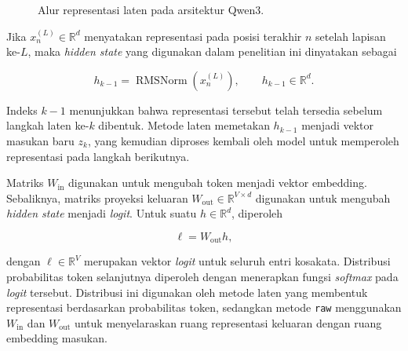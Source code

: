 \begin{figure}[H]
    \caption{Alur representasi laten pada arsitektur Qwen3.}
    \label{fig:alur-qwen3}
\end{figure}



Jika $x_n^{(L)}\in\mathbb{R}^{d}$ menyatakan representasi pada posisi terakhir $n$ setelah lapisan ke-$L$, maka \textit{hidden state} yang digunakan dalam penelitian ini dinyatakan sebagai

\begin{equation}
h_{k-1}
=
\operatorname{RMSNorm}\left(x_n^{(L)}\right),
\qquad
h_{k-1}\in\mathbb{R}^{d}.
\label{eq:m-arch-h}
\end{equation}

Indeks $k-1$ menunjukkan bahwa representasi tersebut telah tersedia sebelum langkah laten ke-$k$ dibentuk. Metode laten memetakan $h_{k-1}$ menjadi vektor masukan baru $z_k$, yang kemudian diproses kembali oleh model untuk memperoleh representasi pada langkah berikutnya.

Matriks $W_{\mathrm{in}}$ digunakan untuk mengubah token menjadi vektor embedding. Sebaliknya, matriks proyeksi keluaran $W_{\mathrm{out}}\in\mathbb{R}^{V\times d}$ digunakan untuk mengubah \textit{hidden state} menjadi \textit{logit}. Untuk suatu $h\in\mathbb{R}^{d}$, diperoleh

\begin{equation}
\ell
=
W_{\mathrm{out}}h,
\label{eq:m-arch-logit}
\end{equation}

dengan $\ell\in\mathbb{R}^{V}$ merupakan vektor \textit{logit} untuk seluruh entri kosakata. Distribusi probabilitas token selanjutnya diperoleh dengan menerapkan fungsi \textit{softmax} pada \textit{logit} tersebut. Distribusi ini digunakan oleh metode laten yang membentuk representasi berdasarkan probabilitas token, sedangkan metode \texttt{raw} menggunakan $W_{\mathrm{in}}$ dan $W_{\mathrm{out}}$ untuk menyelaraskan ruang representasi keluaran dengan ruang embedding masukan.

